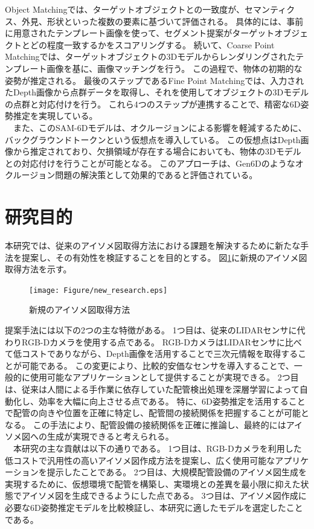 Object Matchingでは、ターゲットオブジェクトとの一致度が、セマンティクス、外見、形状といった複数の要素に基づいて評価される。
具体的には、事前に用意されたテンプレート画像を使って、セグメント提案がターゲットオブジェクトとどの程度一致するかをスコアリングする。
続いて、Coarse Point Matchingでは、ターゲットオブジェクトの3Dモデルからレンダリングされたテンプレート画像を基に、画像マッチングを行う。
この過程で、物体の初期的な姿勢が推定される。
最後のステップであるFine Point Matchingでは、入力されたDepth画像から点群データを取得し、それを使用してオブジェクトの3Dモデルの点群と対応付けを行う。
これら4つのステップが連携することで、精密な6D姿勢推定を実現している。\\
　また、このSAM-6Dモデルは、オクルージョンによる影響を軽減するために、バックグラウンドトークンという仮想点を導入している。
この仮想点はDepth画像から推定されており、欠損領域が存在する場合においても、物体の3Dモデルとの対応付けを行うことが可能となる。
このアプローチは、Gen6Dのようなオクルージョン問題の解決策として効果的であると評価されている。


\section{研究目的}
本研究では、従来のアイソメ図取得方法における課題を解決するために新たな手法を提案し、その有効性を検証することを目的とする。
図\ref{fig:f3}に新規のアイソメ図取得方法を示す。\\
\begin{figure}[htbt]
	\centering
	 \texttt{[image: Figure/new\_research.eps]}
	 \caption{新規のアイソメ図取得方法}
	 \label{fig:f3}
\end{figure}

提案手法には以下の2つの主な特徴がある。
1つ目は、従来のLIDARセンサに代わりRGB-Dカメラを使用する点である。
RGB-DカメラはLIDARセンサに比べて低コストでありながら、Depth画像を活用することで三次元情報を取得することが可能である。
この変更により、比較的安価なセンサを導入することで、一般的に使用可能なアプリケーションとして提供することが実現できる。
2つ目は、従来は人間による手作業に依存していた配管検出処理を深層学習によって自動化し、効率を大幅に向上させる点である。
特に、6D姿勢推定を活用することで配管の向きや位置を正確に特定し、配管間の接続関係を把握することが可能となる。
この手法により、配管設備の接続関係を正確に推論し、最終的にはアイソメ図への生成が実現できると考えられる。\\
　本研究の主な貢献は以下の通りである。
1つ目は、RGB-Dカメラを利用した低コストで汎用性の高いアイソメ図作成方法を提案し、広く使用可能なアプリケーションを提示したことである。
2つ目は、大規模配管設備のアイソメ図生成を実現するために、仮想環境で配管を構築し、実環境との差異を最小限に抑えた状態でアイソメ図を生成できるようにした点である。
3つ目は、アイソメ図作成に必要な6D姿勢推定モデルを比較検証し、本研究に適したモデルを選定したことである。



